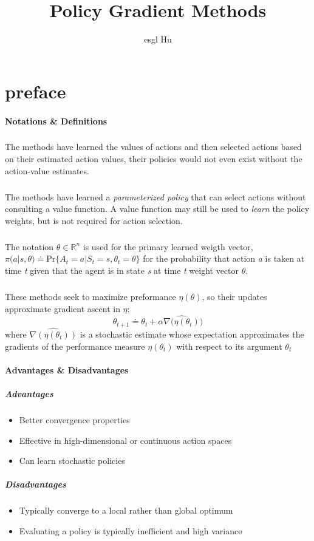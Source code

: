 \documentclass[12pt,a4paper]{article}
\begin{document}
\title{Policy Gradient Methods}
\author{esgl Hu}
\maketitle
\section{preface}

\paragraph{Notations \& Definitions}
\subparagraph{}The methods have learned the values of actions and then selected actions based on their estimated action values, their policies would not even exist without the action-value estimates.

\subparagraph{}The methods have learned a \textit{parameterized policy} that can select actions without consulting a value function. A value function may still be used to \textit{learn} the policy weights, but is not required for action selection.

\subparagraph{}The notation $\theta \in \mathbb{R}^{n}$ is used for the primary learned weigth vector, $\pi (a|s, \theta) \doteq \text{Pr}\{A_{t}=a | S_{t} = s, {\theta}_{t} = \theta\}$ for the probability that action \textit{a} is taken at time \textit{t} given that the agent is in state \textit{s} at time \textit{t} weight vector \textbf{$\theta$}.

\subparagraph{}These methods seek to maximize preformance $\eta(\theta)$, so their updates approximate gradient ascent in $\eta$:
\begin{equation}
\theta_{t+1} \doteq \theta_{t} + \alpha \widehat{\nabla(\eta(\theta_{t})})
\end{equation}
where $\widehat{\nabla(\eta(\theta_{t}))}$ is a stochastic estimate whose expectation approximates the gradients of the performance measure $\eta(\theta_{t})$ with respect to its argument $\theta_{t}$
\paragraph{Advantages \& Disadvantages}
\subparagraph{Advantages}
\begin{itemize}
\item Better convergence properties
\item Effective in high-dimensional or continuous action spaces
\item Can learn stochastic policies
\end{itemize}
\subparagraph{Disadvantages}
\begin{itemize}
\item Typically converge to a local rather than global optimum
\item Evaluating a policy is typically inefficient and high variance
\end{itemize}
\end{document}
